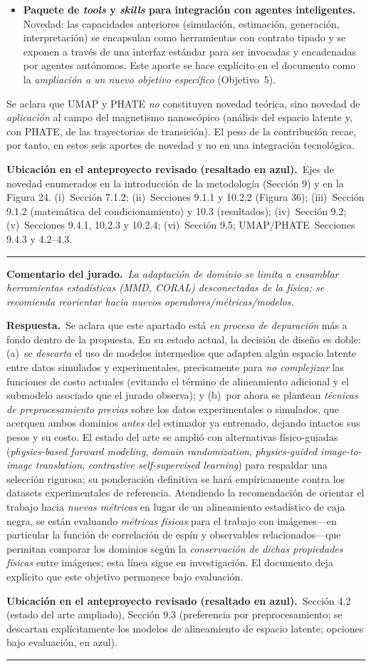 \documentclass[11pt]{article}
\newcommand{\comentario}[1]{\par\smallskip\noindent\textbf{\color{jgris}Comentario del jurado.}\ \textit{#1}\par}
\newcommand{\respuesta}[1]{\par\smallskip\noindent\textbf{\color{jverde}Respuesta.}\ #1\par}
\newcommand{\ubic}[1]{\par\smallskip\noindent\textbf{\color{jazul}Ubicación en el anteproyecto revisado (resaltado en azul).}\ #1\par\medskip\hrule\medskip}
\begin{document}
{\begin{itemize}
  \item[(vi)] \textbf{Paquete de \emph{tools} y \emph{skills} para integración con agentes inteligentes.} Novedad: las capacidades anteriores (simulación, estimación, generación, interpretación) se encapsulan como herramientas con contrato tipado y se exponen a través de una interfaz estándar para ser invocadas y encadenadas por agentes autónomos. Este aporte se hace explícito en el documento como la \emph{ampliación a un nuevo objetivo específico} (Objetivo~5).
\end{itemize}
Se aclara que UMAP y PHATE \emph{no} constituyen novedad teórica, sino novedad de \emph{aplicación} al campo del magnetismo nanoscópico (análisis del espacio latente y, con PHATE, de las trayectorias de transición). El peso de la contribución recae, por tanto, en estos seis aportes de novedad y no en una integración tecnológica.}
\ubic{Ejes de novedad enumerados en la introducción de la metodología (Sección 9) y en la Figura 24. (i)~Sección 7.1.2; (ii)~Secciones 9.1.1 y 10.2.2 (Figura 36); (iii)~Sección 9.1.2 (matemática del condicionamiento) y 10.3 (resultados); (iv)~Sección 9.2; (v)~Secciones 9.4.1, 10.2.3 y 10.2.4; (vi)~Sección 9.5; UMAP/PHATE~Secciones 9.4.3 y 4.2--4.3.}

\comentario{La adaptación de dominio se limita a ensamblar herramientas estadísticas (MMD, CORAL) desconectadas de la física; se recomienda reorientar hacia nuevos operadores/métricas/modelos.}
\respuesta{Se aclara que este apartado está \emph{en proceso de depuración} más a fondo dentro de la propuesta. En su estado actual, la decisión de diseño es doble: (a)~se \emph{descarta} el uso de modelos intermedios que adapten algún espacio latente entre datos simulados y experimentales, precisamente para \emph{no complejizar} las funciones de costo actuales (evitando el término de alineamiento adicional y el submodelo asociado que el jurado observa); y (b)~por ahora se plantean \emph{técnicas de preprocesamiento previas} sobre los datos experimentales o simulados, que acerquen ambos dominios \emph{antes} del estimador ya entrenado, dejando intactos sus pesos y su costo. El estado del arte se amplió con alternativas físico-guiadas (\emph{physics-based forward modeling}, \emph{domain randomization}, \emph{physics-guided image-to-image translation}, \emph{contrastive self-supervised learning}) para respaldar una selección rigurosa; su ponderación definitiva se hará empíricamente contra los datasets experimentales de referencia. Atendiendo la recomendación de orientar el trabajo hacia \emph{nuevas métricas} en lugar de un alineamiento estadístico de caja negra, se están evaluando \emph{métricas físicas} para el trabajo con imágenes---en particular la función de correlación de espín y observables relacionados---que permitan comparar los dominios según la \emph{conservación de dichas propiedades físicas} entre imágenes; esta línea sigue en investigación. El documento deja explícito que este objetivo permanece bajo evaluación.}
\ubic{Sección 4.2 (estado del arte ampliado), Sección 9.3 (preferencia por preprocesamiento; se descartan explícitamente los modelos de alineamiento de espacio latente; opciones bajo evaluación, en azul).}
\end{document}
